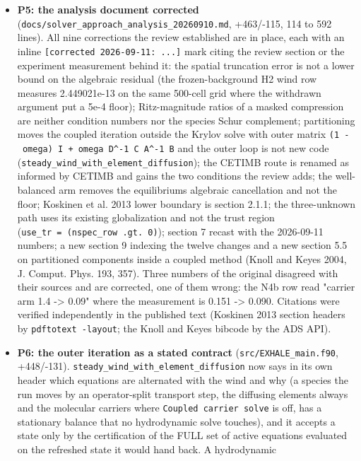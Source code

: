 \documentclass[english,a4paper]{my_memo}
\begin{document}
\begin{itemize}
  any path.
\item
  \textbf{P5: the analysis document corrected} (\texttt{docs/solver\_approach\_analysis\_20260910.md},
  +463/-115, 114 to 592 lines). All nine corrections the review established
  are in place, each with an inline \texttt{{[}corrected\ 2026-09-11:\ ...{]}} mark citing
  the review section or the experiment measurement behind it: the spatial
  truncation error is not a lower bound on the algebraic residual (the
  frozen-background H2 wind row measures 2.449021e-13 on the same 500-cell
  grid where the withdrawn argument put a 5e-4 floor); Ritz-magnitude ratios
  of a masked compression are neither condition numbers nor the species Schur
  complement; partitioning moves the coupled iteration outside the Krylov
  solve with outer matrix \texttt{(1\ -\ omega)\ I\ +\ omega\ D\^{}-1\ C\ A\^{}-1\ B} and the outer
  loop is not new code (\texttt{steady\_wind\_with\_element\_diffusion}); the CETIMB
  route is renamed as informed by CETIMB and gains the two conditions the
  review adds; the well-balanced arm removes the equilibrium\textquotesingle s algebraic
  cancellation and not the floor; Koskinen et al. 2013 lower boundary is
  section 2.1.1; the three-unknown path uses its existing globalization and
  not the trust region (\texttt{use\_tr\ =\ (nspec\_row\ .gt.\ 0)}); section 7 recast with
  the 2026-09-11 numbers; a new section 9 indexing the twelve changes and a
  new section 5.5 on partitioned components inside a coupled method (Knoll
  and Keyes 2004, J. Comput. Phys. 193, 357). Three numbers of the original
  disagreed with their sources and are corrected, one of them wrong: the N4b
  row read "carrier arm 1.4 -\textgreater{} 0.09" where the measurement is 0.151 -\textgreater{}
  0.090. Citations were verified independently in the published text
  (Koskinen 2013 section headers by \texttt{pdftotext\ -layout}; the Knoll and Keyes
  bibcode by the ADS API).
\item
  \textbf{P6: the outer iteration as a stated contract} (\texttt{src/EXHALE\_main.f90},
  +448/-131). \texttt{steady\_wind\_with\_element\_diffusion} now says in its own header
  which equations are alternated with the wind and why (a species the run
  moves by an operator-split transport step, the diffusing elements always
  and the molecular carriers where \texttt{Coupled\ carrier\ solve} is off, has a
  stationary balance that no hydrodynamic solve touches), and it accepts a
  state only by the certification of the FULL set of active equations
  evaluated on the refreshed state it would hand back. A hydrodynamic

\end{itemize}
\end{document}
